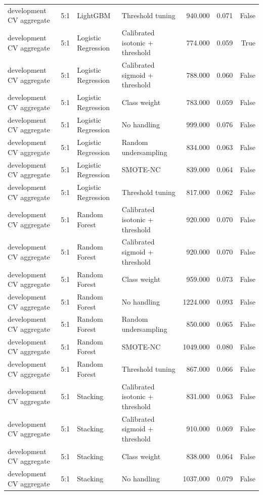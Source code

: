 \begin{tabular}{llllrrr}
development CV aggregate & 5:1 & LightGBM & Threshold tuning & 940.000 & 0.071 & False \\
development CV aggregate & 5:1 & Logistic Regression & Calibrated isotonic + threshold & 774.000 & 0.059 & True \\
development CV aggregate & 5:1 & Logistic Regression & Calibrated sigmoid + threshold & 788.000 & 0.060 & False \\
development CV aggregate & 5:1 & Logistic Regression & Class weight & 783.000 & 0.059 & False \\
development CV aggregate & 5:1 & Logistic Regression & No handling & 999.000 & 0.076 & False \\
development CV aggregate & 5:1 & Logistic Regression & Random undersampling & 834.000 & 0.063 & False \\
development CV aggregate & 5:1 & Logistic Regression & SMOTE-NC & 839.000 & 0.064 & False \\
development CV aggregate & 5:1 & Logistic Regression & Threshold tuning & 817.000 & 0.062 & False \\
development CV aggregate & 5:1 & Random Forest & Calibrated isotonic + threshold & 920.000 & 0.070 & False \\
development CV aggregate & 5:1 & Random Forest & Calibrated sigmoid + threshold & 920.000 & 0.070 & False \\
development CV aggregate & 5:1 & Random Forest & Class weight & 959.000 & 0.073 & False \\
development CV aggregate & 5:1 & Random Forest & No handling & 1224.000 & 0.093 & False \\
development CV aggregate & 5:1 & Random Forest & Random undersampling & 850.000 & 0.065 & False \\
development CV aggregate & 5:1 & Random Forest & SMOTE-NC & 1049.000 & 0.080 & False \\
development CV aggregate & 5:1 & Random Forest & Threshold tuning & 867.000 & 0.066 & False \\
development CV aggregate & 5:1 & Stacking & Calibrated isotonic + threshold & 831.000 & 0.063 & False \\
development CV aggregate & 5:1 & Stacking & Calibrated sigmoid + threshold & 910.000 & 0.069 & False \\
development CV aggregate & 5:1 & Stacking & Class weight & 838.000 & 0.064 & False \\
development CV aggregate & 5:1 & Stacking & No handling & 1037.000 & 0.079 & False \\

\end{tabular}
